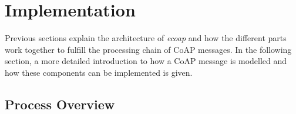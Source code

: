 





\section{Implementation}

Previous sections explain the architecture of \textit{ecoap} and how the different parts work together to fulfill the processing chain of CoAP messages. In the following section, a more detailed introduction to how a CoAP message is modelled and how these components can be implemented is given.

\subsection{Process Overview}

